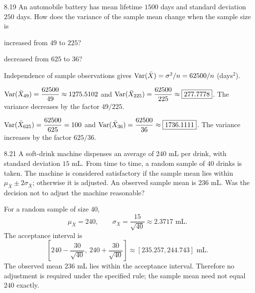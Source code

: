 \documentclass[11pt,oneside]{article}
\begin{document}
\begin{exercise}{8.19}
An automobile battery has mean lifetime $1500$ days and standard deviation $250$ days. How does the variance of the sample mean change when the sample size is
\begin{exercisesubparts}
\item increased from $49$ to $225$?
\item decreased from $625$ to $36$?
\end{exercisesubparts}
\end{exercise}
\begin{solution}
Independence of sample observations gives $\operatorname{Var}(\bar X)=\sigma^2/n=62500/n$ (days$^2$).
\begin{exercisesubparts}
\item $\displaystyle\operatorname{Var}(\bar X_{49})=\frac{62500}{49}\approx1275.5102$ and $\displaystyle\operatorname{Var}(\bar X_{225})=\frac{62500}{225}\approx\boxed{277.7778}$. The variance decreases by the factor $49/225$.
\item $\displaystyle\operatorname{Var}(\bar X_{625})=\frac{62500}{625}=100$ and $\displaystyle\operatorname{Var}(\bar X_{36})=\frac{62500}{36}\approx\boxed{1736.1111}$. The variance increases by the factor $625/36$.
\end{exercisesubparts}
\end{solution}

\begin{exercise}{8.21}
A soft-drink machine dispenses an average of $240$ mL per drink, with standard deviation $15$ mL. From time to time, a random sample of $40$ drinks is taken. The machine is considered satisfactory if the sample mean lies within $\mu_{\bar X}\pm2\sigma_{\bar X}$; otherwise it is adjusted. An observed sample mean is $236$ mL. Was the decision not to adjust the machine reasonable?
\end{exercise}
\begin{solution}
For a random sample of size $40$,
\[
\mu_{\bar X}=240, \qquad
\sigma_{\bar X}=\frac{15}{\sqrt{40}}\approx2.3717\text{ mL}.
\]
The acceptance interval is
\[
\left[240-\frac{30}{\sqrt{40}}, \ 240+\frac{30}{\sqrt{40}}\right]
\approx[235.257, 244.743]\text{ mL}.
\]
The observed mean $236$ mL lies within the acceptance interval. Therefore no adjustment is required under the specified rule; the sample mean need not equal $240$ exactly.
\end{solution}
\end{document}
